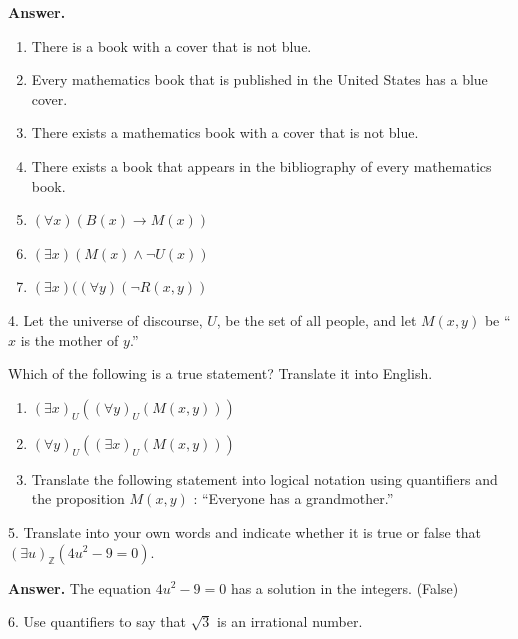 \documentclass[10pt,]{book}
\theoremstyle{plain}
\theoremstyle{definition}
\theoremstyle{definition}
\theoremstyle{definition}
\theoremstyle{definition}
\begin{document}
\begin{exercisegroup}
%
\par\smallskip
\par\smallskip
\noindent\textbf{Answer.}\hypertarget{answer-24}{}\quad
\leavevmode%
\begin{enumerate}[label=\alph*]
\item\hypertarget{li-307}{} There is a book with a cover that is not blue.%
\item\hypertarget{li-308}{}Every mathematics book that is published in the United States has a blue cover.%
\item\hypertarget{li-309}{} There exists a mathematics book with a cover that is not blue.%
\item\hypertarget{li-310}{}There exists a book that appears in the bibliography of every mathematics book.%
\item\hypertarget{li-311}{} \((\forall x)(B(x)\to M(x))\)%
\item\hypertarget{li-312}{} \((\exists x)(M(x)\land \neg U(x))\)%
\item\hypertarget{li-313}{} \((\exists x)((\forall y)(\neg R(x,y))\)%
\end{enumerate}
%
\item[4.]\hypertarget{exercise-55}{}Let the universe of discourse, \(U\), be the set of all people, and let \(M(x, y)\) be ``\(x\) is the mother of \(y\).''%
\par
Which of the following is a true statement? Translate it into English.%
\par
\leavevmode%
\begin{enumerate}[label=\alph*]
\item\hypertarget{li-314}{}  \((\exists  x)_U((\forall y)_U(M(x,y)))\)%
\item\hypertarget{li-315}{}  \((\forall y)_U((\exists  x)_U(M(x,y)))\)%
\item\hypertarget{li-316}{}Translate the following statement into logical notation using quantifiers and the proposition \(M(x, y)\) :  ``Everyone has a grandmother.''%
\end{enumerate}
%
\par\smallskip
\item[5.]\hypertarget{exercise-56}{}Translate into your own words and indicate whether it is true or false that \((\exists u) _{\mathbb{Z}} (4 u^2 -9 = 0)\).
%
\par\smallskip
\par\smallskip
\noindent\textbf{Answer.}\hypertarget{answer-25}{}\quad
 The equation \(4u^2-9=0\) has a solution in the integers. (False)%
\item[6.]\hypertarget{exercise-57}{}Use quantifiers to say that \(\sqrt{3}\) is an irrational number.%

\end{exercisegroup}
\end{document}
